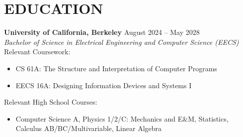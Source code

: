 \section*{EDUCATION}
\noindent
\textbf{University of California, Berkeley} \hfill August 2024 -- May 2028 \\
\textit{Bachelor of Science in Electrical Engineering and Computer Science (EECS)} \\
\noindent
Relevant Coursework:
\begin{itemize}
	\item CS 61A: The Structure and Interpretation of Computer Programs
	\item EECS 16A: Designing Information Devices and Systems I \\
\end{itemize}

\noindent
Relevant High School Courses:
\begin{itemize}
	\item Computer Science A, Physics 1/2/C: Mechanics and E\&M, Statistics, Calculus AB/BC/Multivariable, Linear Algebra
\end{itemize}
